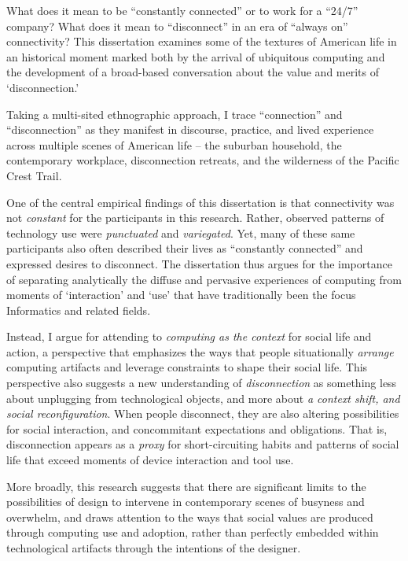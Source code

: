 \thesisabstract
{
What does it mean to be “constantly connected” or to work for a “24/7” company? What does it mean to ``disconnect'' in an era of “always on” connectivity? This dissertation examines some of the textures of American life in an historical moment marked both by the arrival of ubiquitous computing and the development of a broad-based conversation about the value and merits of ‘disconnection.’

Taking a multi-sited ethnographic approach, I trace ``connection'' and ``disconnection'' as they manifest in discourse, practice, and lived experience across multiple scenes of American life -- the suburban household, the contemporary workplace, disconnection retreats, and the wilderness of the Pacific Crest Trail.

One of the central empirical findings of this dissertation is that connectivity was not \emph{constant} for the participants in this research. Rather, observed patterns of technology use were \emph{punctuated} and \emph{variegated}. Yet, many of these same participants also often described their lives as ``constantly connected'' and expressed desires to disconnect. 
The dissertation thus argues for the importance of separating analytically the diffuse and pervasive experiences of computing from moments of ‘interaction’ and ‘use’ that have traditionally been the focus Informatics and related fields.

Instead, I argue for attending to \emph{computing as the context} for social life and action, a perspective that emphasizes the ways that people situationally \emph{arrange} computing artifacts and leverage constraints to shape their social life. This perspective also suggests a new understanding of \emph{disconnection} as something less about unplugging from technological objects, and more about \emph{a context shift, and social reconfiguration}. When people disconnect, they are also altering possibilities for social interaction, and concommitant expectations and obligations. That is, disconnection appears as a \emph{proxy} for short-circuiting habits and patterns of social life that exceed moments of device interaction and tool use.

More broadly, this research suggests that there are significant limits to the possibilities of design to intervene in contemporary scenes of busyness and overwhelm, and draws attention to the ways that social values are produced through computing use and adoption, rather than perfectly embedded within technological artifacts through the intentions of the designer.
}


